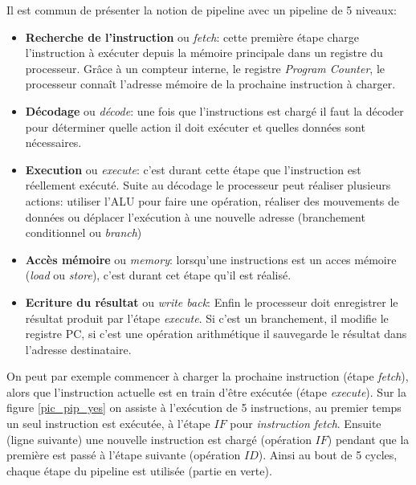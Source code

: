  Il est commun de présenter la notion de pipeline avec un pipeline de 5 niveaux:

\begin{itemize}
    \item \textbf{Recherche de l'instruction} ou \textit{fetch}: cette première étape charge l'instruction à exécuter depuis la mémoire principale dans un registre du processeur. Grâce à un compteur interne, le registre \textit{Program Counter}, le processeur connaît l'adresse mémoire de la prochaine instruction à charger.
    \item \textbf{Décodage} ou \textit{décode}: une fois que l'instructions est chargé il faut la décoder pour déterminer quelle action il doit exécuter et quelles données sont nécessaires.
    \item \textbf{Execution} ou \textit{execute}: c'est durant cette étape que l'instruction est réellement exécuté. Suite au décodage le processeur peut réaliser plusieurs actions: utiliser l'ALU pour faire une opération, réaliser des mouvements de données ou déplacer l'exécution à une nouvelle adresse (branchement conditionnel ou \textit{branch})
    \item \textbf{Accès mémoire} ou \textit{memory}: lorsqu'une instructions est un acces mémoire (\textit{load} ou \textit{store}), c'est durant cet étape qu'il est réalisé.
    \item \textbf{Ecriture du résultat} ou \textit{write back}: Enfin le processeur doit enregistrer le résultat produit par l'étape \textit{execute}. Si c'est un branchement, il modifie le registre PC, si c'est une opération arithmétique il sauvegarde le résultat dans l'adresse destinataire.
\end{itemize}

On peut par exemple commencer à charger la prochaine instruction (étape \textit{fetch}), alors que l'instruction actuelle est en train d'être exécutée (étape \textit{execute}). Sur la figure \ref{pic_pip_yes} on assiste à l'exécution de 5 instructions, au premier temps un seul instruction est exécutée, à l'étape $IF$ pour \textit{instruction fetch}. Ensuite (ligne suivante) une nouvelle instruction est chargé (opération $IF$) pendant que la première est passé à l'étape suivante (opération $ID$). Ainsi au bout de 5 cycles, chaque étape du pipeline est utilisée (partie en verte). 



